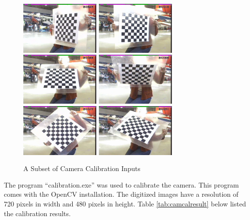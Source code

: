 \begin{figure}[h]
  \centering
  \includegraphics[width=4cm,keepaspectratio=true]{./Figures/camcal/camcal1_130.jpeg}
  \includegraphics[width=4cm,keepaspectratio=true]{./Figures/camcal/camcal1_140.jpeg}
  \includegraphics[width=4cm,keepaspectratio=true]{./Figures/camcal/camcal1_160.jpeg}
  \includegraphics[width=4cm,keepaspectratio=true]{./Figures/camcal/camcal1_180.jpeg}
  \includegraphics[width=4cm,keepaspectratio=true]{./Figures/camcal/camcal1_210.jpeg}
  \includegraphics[width=4cm,keepaspectratio=true]{./Figures/camcal/camcal1_240.jpeg}
  \caption{A Subset of Camera Calibration Inputs}
  \label{fig:camcal}
\end{figure}

The program ``calibration.exe'' was used to calibrate the camera. This program comes with the OpenCV installation. The digitized images have a resolution of 720 pixels in width and 480 pixels in height. Table \ref{tab:camcalresult} below listed the calibration results.

